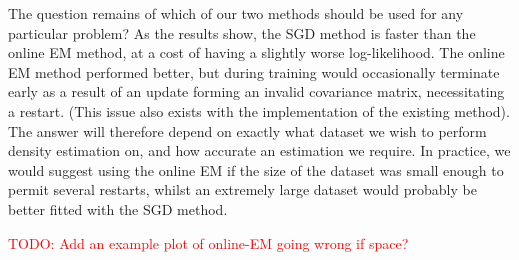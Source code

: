 \documentclass{article}
\newcommand{\todo}[1]{\textcolor{red}{TODO: #1}}
\begin{document}
The question remains of which of our two methods should be used for any particular problem?
As the results show, the SGD method is faster than the online EM method, at a cost of having a slightly worse log-likelihood.
The online EM method performed better, but during training would occasionally terminate early as a result of an update forming an invalid covariance matrix, necessitating a restart.
(This issue also exists with the implementation of the existing method).
The answer will therefore depend on exactly what dataset we wish to perform density estimation on, and how accurate an estimation we require.
In practice, we would suggest using the online EM if the size of the dataset was small enough to permit several restarts, whilst an extremely large dataset would probably be better fitted with the SGD method.

\todo{Add an example plot of online-EM going wrong if space?}



\end{document}
